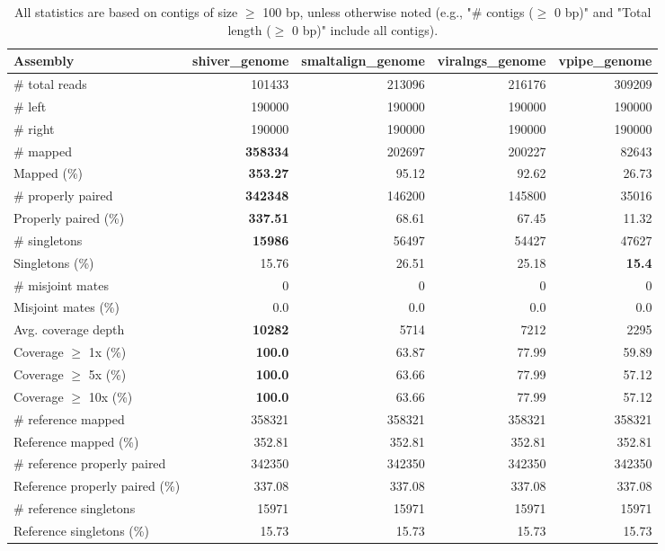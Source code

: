 \documentclass[12pt,a4paper]{article}
\begin{document}
\begin{table}[ht]
\begin{center}
\caption{All statistics are based on contigs of size $\geq$ 100 bp, unless otherwise noted (e.g., "\# contigs ($\geq$ 0 bp)" and "Total length ($\geq$ 0 bp)" include all contigs).}
\begin{tabular}{|l*{4}{|r}|}
\hline
Assembly & shiver\_genome & smaltalign\_genome & viralngs\_genome & vpipe\_genome \\ \hline
\# total reads & 101433 & 213096 & 216176 & 309209 \\ \hline
\# left & 190000 & 190000 & 190000 & 190000 \\ \hline
\# right & 190000 & 190000 & 190000 & 190000 \\ \hline
\# mapped & {\bf 358334} & 202697 & 200227 & 82643 \\ \hline
Mapped (\%) & {\bf 353.27} & 95.12 & 92.62 & 26.73 \\ \hline
\# properly paired & {\bf 342348} & 146200 & 145800 & 35016 \\ \hline
Properly paired (\%) & {\bf 337.51} & 68.61 & 67.45 & 11.32 \\ \hline
\# singletons & {\bf 15986} & 56497 & 54427 & 47627 \\ \hline
Singletons (\%) & 15.76 & 26.51 & 25.18 & {\bf 15.4} \\ \hline
\# misjoint mates & 0 & 0 & 0 & 0 \\ \hline
Misjoint mates (\%) & 0.0 & 0.0 & 0.0 & 0.0 \\ \hline
Avg. coverage depth & {\bf 10282} & 5714 & 7212 & 2295 \\ \hline
Coverage $\geq$ 1x (\%) & {\bf 100.0} & 63.87 & 77.99 & 59.89 \\ \hline
Coverage $\geq$ 5x (\%) & {\bf 100.0} & 63.66 & 77.99 & 57.12 \\ \hline
Coverage $\geq$ 10x (\%) & {\bf 100.0} & 63.66 & 77.99 & 57.12 \\ \hline
\# reference mapped & 358321 & 358321 & 358321 & 358321 \\ \hline
Reference mapped (\%) & 352.81 & 352.81 & 352.81 & 352.81 \\ \hline
\# reference properly paired & 342350 & 342350 & 342350 & 342350 \\ \hline
Reference properly paired (\%) & 337.08 & 337.08 & 337.08 & 337.08 \\ \hline
\# reference singletons & 15971 & 15971 & 15971 & 15971 \\ \hline
Reference singletons (\%) & 15.73 & 15.73 & 15.73 & 15.73 \\ \hline

\end{tabular}
\end{center}
\end{table}
\end{document}
